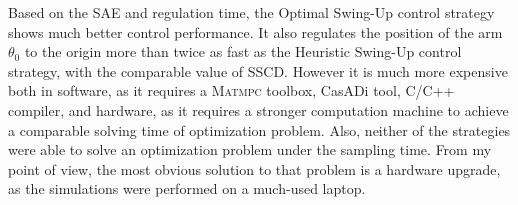 Based on the SAE and regulation time, the  Optimal Swing-Up control strategy shows much better control performance. It also regulates the position of the arm $\theta_0$ to the origin more than twice as fast as the Heuristic Swing-Up control strategy, with the comparable value of SSCD. However it is much more expensive both in software, as it requires a \textsc{Matmpc} toolbox, CasADi tool, C/C++ compiler, and hardware, as it requires a stronger computation machine to achieve a comparable solving time of optimization problem. Also, neither of the strategies were able to solve an optimization problem under the sampling time. From my point of view, the most obvious solution to that problem is a hardware upgrade, as the simulations were performed on a much-used laptop.